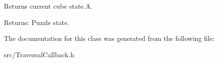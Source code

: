 Returns current cube state.A. 

\begin{Desc}
\item[Returns:]Puzzle state. \end{Desc}


The documentation for this class was generated from the following file:\begin{CompactItemize}
\item 
src/TraversalCallback.h\end{CompactItemize}
